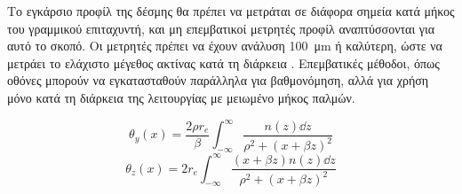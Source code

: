 Το εγκάρσιο προφίλ της δέσμης θα πρέπει να μετράται σε διάφορα σημεία κατά μήκος του γραμμικού επιταχυντή, και μη επεμβατικοί μετρητές προφίλ αναπτύσσονται για αυτό το σκοπό.
Οι μετρητές πρέπει να έχουν ανάλυση \SI{100}{\micro \meter} ή καλύτερη, ώστε να μετράει το ελάχιστο μέγεθος ακτίνας κατά τη διάρκεια .
Επεμβατικές μέθοδοι, όπως οθόνες  μπορούν να εγκατασταθούν παράλληλα για βαθμονόμηση, αλλά για χρήση μόνο κατά τη διάρκεια της λειτουργίας με μειωμένο μήκος παλμών.

\begin{equation}
\theta_y (x) = \frac{2 \rho r_e}{\beta} \int_{-\infty}^{\infty}\frac{n(z) \dd z}{\rho^2 + \left(x+\beta z \right) ^2}
\end{equation}
\begin{equation}
\theta_z(x) = 2 r_e \int_{-\infty}^{\infty}\frac{(x+\beta z)n(z) \dd z}{\rho^2 + \left(x+\beta z \right) ^2}
\end{equation}